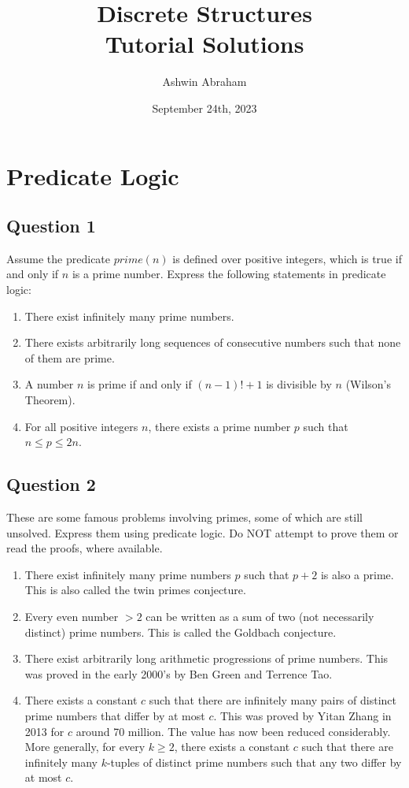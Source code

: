 \documentclass[12pt]{report}
\title{\Huge \textbf{Discrete Structures}\\\Large \textbf{Tutorial Solutions}}
\author{\Large Ashwin Abraham}
\date{\Large September 24th, 2023}
\begin{document}
\begin{titlepage}
    \maketitle
\end{titlepage}

\tableofcontents
\newpage

\chapter{Predicate Logic}
\section*{Question 1}
Assume the predicate $prime(n)$ is defined over positive integers, which is true if and only if $n$ is a prime number. Express the following statements in predicate logic:
\begin{enumerate}
  \item There exist infinitely many prime numbers.
  \item There exists arbitrarily long sequences of consecutive numbers such that none of them are prime.
  \item A number $n$ is prime if and only if $(n - 1)! + 1$ is divisible by $n$ (Wilson's Theorem).
  \item For all positive integers $n$, there exists a prime number $p$ such that $n \leq p \leq 2n$.
\end{enumerate}
\section*{Question 2}
These are some famous problems involving primes, some of which are still unsolved. Express them using predicate logic. Do NOT attempt to prove them or read the proofs, where available.
\begin{enumerate}
  \item There exist infinitely many prime numbers $p$ such that $p + 2$ is also a prime. This is also called the twin primes conjecture.
  \item Every even number $ > 2$  can be written as a sum of two (not necessarily distinct) prime numbers. This is called the Goldbach conjecture.
  \item There exist arbitrarily long arithmetic progressions of prime numbers. This was proved in the early 2000's by Ben Green and Terrence Tao.
  \item There exists a constant $c$ such that there are infinitely many pairs of distinct prime numbers that differ by at most $c$. This was proved by Yitan Zhang in 2013 for $c$ around 70 million. The value has now been
  reduced considerably. More generally, for every $k \geq 2$, there exists a constant $c$ such that there are infinitely many $k$-tuples of distinct prime numbers such that any two differ by at most $c$.
\end{enumerate}
\end{document}
